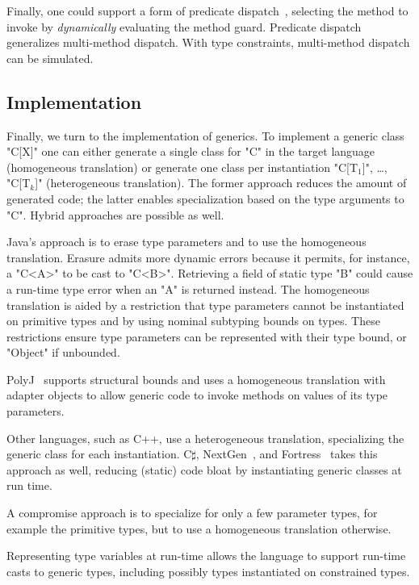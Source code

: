 Finally, one could support a form of predicate
dispatch~\cite{jpred}, selecting the method to invoke by
\emph{dynamically} evaluating the method guard.  Predicate
dispatch generalizes multi-method dispatch.  With type
constraints, multi-method dispatch can be simulated.

\subsection{Implementation}

Finally, we turn to the implementation of generics.
To implement a generic class \xcd"C[X]" one can either generate a single 
class for \xcd"C" in the target language (homogeneous translation)
or generate one class per instantiation
\xcdmath"C[T$_1$]", \dots,
\xcdmath"C[T$_k$]" (heterogeneous translation).
The former approach reduces the amount of generated code; the
latter enables specialization based on the type arguments to
\xcd"C".  Hybrid approaches are possible as well.

Java's approach is to erase type parameters and to use the homogeneous
translation.  Erasure admits more dynamic errors because
it permits, for instance, a \xcd"C<A>" to be cast to \xcd"C<B>".
Retrieving a field of static type \xcd"B" could cause a run-time
type error when an \xcd"A" is returned instead.
The homogeneous translation is aided by a restriction that type
parameters cannot be instantiated on primitive types and by
using nominal subtyping bounds on types.
These restrictions ensure type parameters can be represented
with their type bound, or \xcd"Object" if unbounded.

PolyJ~\cite{java-popl97} supports structural bounds and uses a
homogeneous translation with adapter objects to allow generic
code to invoke methods on values of its type parameters.

Other languages, such as C++, use a heterogeneous
translation, specializing the generic class for each
instantiation.
C$\sharp$,
NextGen~\cite{nextgen}, and
Fortress~\cite{fortress} takes this approach as well, reducing
(static) code bloat by instantiating generic classes at run time.

A compromise approach is to specialize for only a few parameter
types, for example the primitive types, but to use a homogeneous
translation otherwise.

Representing type variables at run-time allows the language
to support run-time casts to generic types,
including possibly types instantiated on constrained types.

